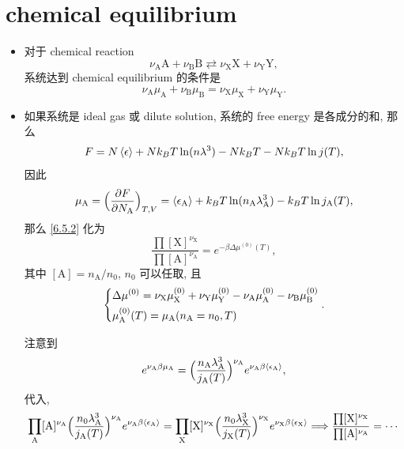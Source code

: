 \section{chemical equilibrium} \label{6.5}
\begin{itemize}
	\item 对于 chemical reaction
	\begin{equation}
		\nu_\text{A} \text{A} + \nu_\text{B} \text{B} \rightleftarrows \nu_\text{X} \text{X} + \nu_\text{Y} \text{Y},
	\end{equation}
	系统达到 chemical equilibrium 的条件是
	\begin{equation} \label{6.5.2}
		\nu_\text{A} \mu_\text{A} + \nu_\text{B} \mu_\text{B} = \nu_\text{X} \mu_\text{X} + \nu_\text{Y} \mu_\text{Y}.
	\end{equation}
	
	\item 如果系统是 ideal gas 或 dilute solution, 系统的 free energy 是各成分的和, 那么
	\begin{equation}
		F = N \braket{\epsilon} + N k_B T \ln(n \lambda^3) - N k_B T - N k_B T \ln j(T),
	\end{equation}
	因此
	\begin{equation}
		\mu_\text{A} = \Big( \frac{\partial F}{\partial N_\text{A}} \Big)_{T, V} = \braket{\epsilon_\text{A}} + k_B T \ln(n_\text{A} \lambda_\text{A}^3) - k_B T \ln j_\text{A}(T),
	\end{equation}
	那么 \eqref{6.5.2} 化为
	\begin{equation}
		\frac{\prod [\text{X}]^{\nu_\text{X}}}{\prod [\text{A}]^{\nu_\text{A}}} = e^{- \beta \Delta \mu^{(0)}(T)},
	\end{equation}
	其中 $[\text{A}] = n_\text{A} / n_0$, $n_0$ 可以任取, 且
	\begin{equation}
		\begin{dcases}
			\Delta \mu^{(0)} = \nu_\text{X} \mu_\text{X}^{(0)} + \nu_\text{Y} \mu_\text{Y}^{(0)} - \nu_\text{A} \mu_\text{A}^{(0)} - \nu_\text{B} \mu_\text{B}^{(0)} \\
			\mu_\text{A}^{(0)}(T) = \mu_\text{A}(n_\text{A} = n_0, T)
		\end{dcases}.
	\end{equation}
	
	\begin{tcolorbox}[title=calculation:]
		注意到
		\begin{equation}
			e^{\nu_\text{A} \beta \mu_\text{A}} = \Big( \frac{n_\text{A} \lambda_\text{A}^3}{j_\text{A}(T)} \Big)^{\nu_\text{A}} e^{\nu_\text{A} \beta \braket{\epsilon_\text{A}}},
		\end{equation}
		代入,
		\begin{equation}
			\prod_\text{A} [\text{A}]^{\nu_\text{A}} \Big( \frac{n_0 \lambda_\text{A}^3}{j_\text{A}(T)} \Big)^{\nu_\text{A}} e^{\nu_\text{A} \beta \braket{\epsilon_\text{A}}} = \prod_\text{X} [\text{X}]^{\nu_\text{X}} \Big( \frac{n_0 \lambda_\text{X}^3}{j_\text{X}(T)} \Big)^{\nu_\text{X}} e^{\nu_\text{X} \beta \braket{\epsilon_\text{X}}} \Longrightarrow \frac{\prod [\text{X}]^{\nu_\text{X}}}{\prod [\text{A}]^{\nu_\text{A}}} = \cdots
		\end{equation}
	\end{tcolorbox}
\end{itemize}

